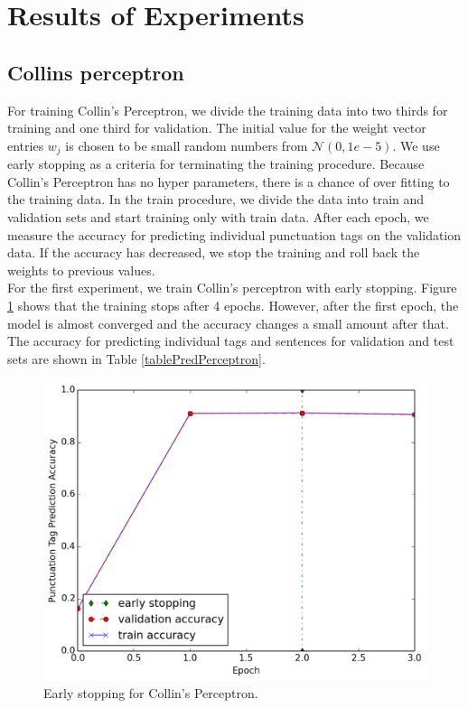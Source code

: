 \documentclass[twoside,12pt]{article}
\begin{document}
\section{Results of Experiments}
\subsection{Collins perceptron}
For training Collin's Perceptron, we divide the training data into two thirds for training and one third for validation. The initial value for the weight vector entries $w_j$ is chosen to be small random numbers from $\mathcal{N}(0,1e-5)$. We use early stopping as a criteria for terminating the training procedure. Because Collin's Perceptron has no hyper parameters, there is a chance of over fitting to the training data. In the train procedure, we divide the data into train and validation sets and start training only with train data. After each epoch, we measure the accuracy for predicting individual punctuation tags on the validation data. If the accuracy has decreased, we stop the training and roll back the weights to previous values.\\
For the first experiment, we train Collin's perceptron with early stopping. Figure \ref{figEarlyStoppingPercGibbs} shows that the training stops after 4 epochs. However, after the first epoch, the model is almost converged and the accuracy changes a small amount after that. The accuracy for predicting individual tags and sentences for validation and test sets are shown in Table \ref{tablePredPerceptron}.\\

\begin{figure}[H]
\centering
\includegraphics[width=.7\textwidth]{./figs/Perceptron/Perceptron.png}
\caption{Early stopping for Collin's Perceptron. }
\label{figEarlyStoppingPercGibbs}
\end{figure}
\end{document}
